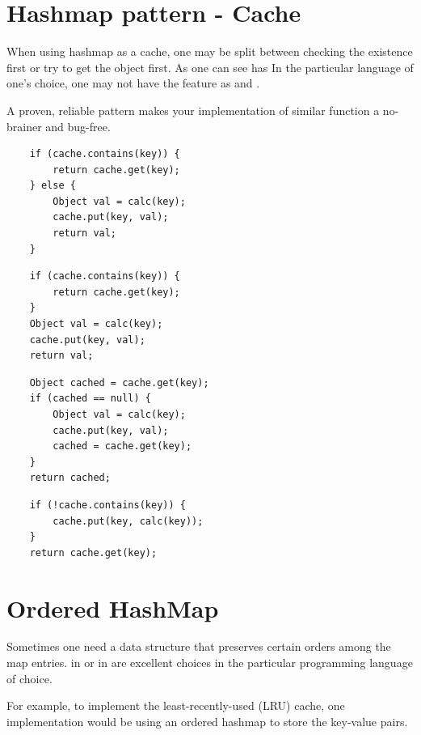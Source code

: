 
\section{Hashmap pattern - Cache}\label{sec:hashmappattern-cache}

When using hashmap as a cache, one may be split between checking the existence first or try to
get the object first.
As one can see \java has
In the particular language of one's choice, one may not have the feature as \java and \python.


A proven, reliable pattern makes your implementation of similar function a no-brainer and bug-free.

\begin{lstlisting}
    if (cache.contains(key)) {
        return cache.get(key);
    } else {
        Object val = calc(key);
        cache.put(key, val);
        return val;
    }
\end{lstlisting}

\begin{lstlisting}
    if (cache.contains(key)) {
        return cache.get(key);
    }
    Object val = calc(key);
    cache.put(key, val);
    return val;
\end{lstlisting}

\begin{lstlisting}
    Object cached = cache.get(key);
    if (cached == null) {
        Object val = calc(key);
        cache.put(key, val);
        cached = cache.get(key);
    }
    return cached;
\end{lstlisting}

\begin{lstlisting}
    if (!cache.contains(key)) {
        cache.put(key, calc(key));
    }
    return cache.get(key);
\end{lstlisting}

\section{Ordered HashMap}
Sometimes one need a data structure that preserves certain orders among the map entries.
 in \python or  in \java are excellent choices in the
particular programming language of choice.

For example, to implement the least-recently-used (LRU) cache, one implementation would be using
an ordered hashmap to store the key-value pairs.
